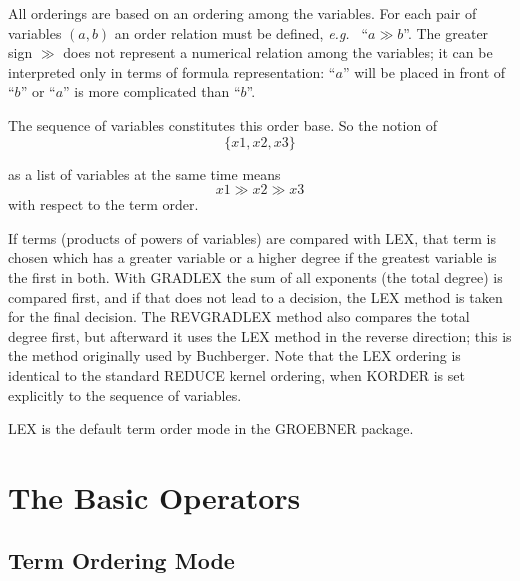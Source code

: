 \documentclass[11pt,letterpaper]{book}
\newcommand{\REDUCE}{REDUCE}
\begin{document}
All orderings are based on an ordering among the variables.  For each
pair of variables $(a,b)$ an order relation must be defined, {\em
e.g.\ } ``$ a\gg b $''.  The greater sign $\gg$  does not represent a
numerical relation among the variables; it can be interpreted only in
terms of formula representation: ``$a$'' will be placed in front of
``$b$'' or ``$a$''  is more complicated than ``$b$''.

The sequence of variables constitutes this order base.  So the notion
of
\[
\{x1,x2,x3\}
\]

as a list of variables at the same time means
\[
x1 \gg x2 \gg x3
\]
with respect to the term order.

If terms (products of powers of variables) are compared with LEX,
that term is chosen which has a greater variable or a higher degree
if the greatest variable is the first in both.  With GRADLEX the sum of
all exponents (the total degree) is compared first, and if that does
not lead to a decision, the LEX method is taken for the final decision.
The REVGRADLEX method also compares the total degree first, but
afterward it uses the LEX method in the reverse direction; this is the
method originally used by Buchberger.
Note that the LEX ordering is identical to the standard \REDUCE{}
kernel ordering, when KORDER is set explicitly to the sequence of
variables.

LEX is the default term order mode in the GROEBNER package.

\section{The Basic Operators}
\subsection{Term Ordering Mode}
\end{document}
